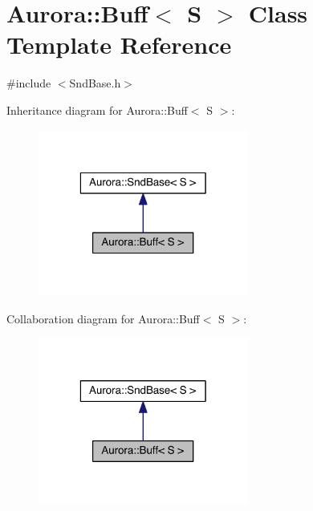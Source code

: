 \hypertarget{class_aurora_1_1_buff}{}\section{Aurora\+:\+:Buff$<$ S $>$ Class Template Reference}
\label{class_aurora_1_1_buff}


{\ttfamily \#include $<$Snd\+Base.\+h$>$}



Inheritance diagram for Aurora\+:\+:Buff$<$ S $>$\+:\nopagebreak
\begin{figure}[H]
\begin{center}
\leavevmode
\includegraphics[width=196pt]{class_aurora_1_1_buff__inherit__graph}
\end{center}
\end{figure}


Collaboration diagram for Aurora\+:\+:Buff$<$ S $>$\+:\nopagebreak
\begin{figure}[H]
\begin{center}
\leavevmode
\includegraphics[width=196pt]{class_aurora_1_1_buff__coll__graph}
\end{center}
\end{figure}
